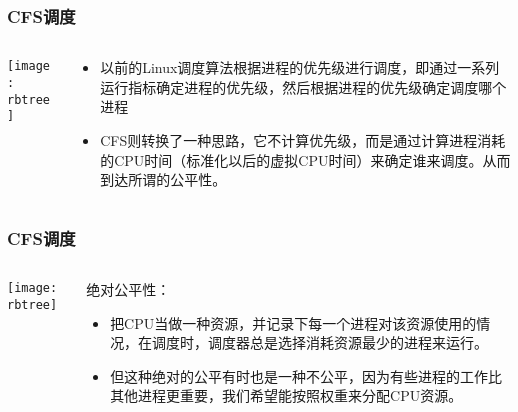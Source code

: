
\begin{frame}
	\frametitle{CFS调度}
	\begin{columns}
	\begin{column}{.4\textwidth}
	\Large \centering
	
    \texttt{[image: rbtree]}
	
	\end{column}
	
	\begin{column}{.6\textwidth}
\begin{itemize}
	\item 以前的Linux调度算法根据进程的优先级进行调度，即通过一系列运行指标确定进程的优先级，然后根据进程的优先级确定调度哪个进程
	\item CFS则转换了一种思路，它不计算优先级，而是通过计算进程消耗的CPU时间（标准化以后的虚拟CPU时间）来确定谁来调度。从而到达所谓的公平性。

	\end{itemize}

	\end{column}
\end{columns}
\end{frame}


\begin{frame}
	\frametitle{CFS调度}
	\begin{columns}
		\begin{column}{.4\textwidth}
			\Large \centering
			
			\texttt{[image: rbtree]}
			
		\end{column}
		
		\begin{column}{.6\textwidth}
			绝对公平性：
			\begin{itemize}
				\item 把CPU当做一种资源，并记录下每一个进程对该资源使用的情况，在调度时，调度器总是选择消耗资源最少的进程来运行。
				\item 但这种绝对的公平有时也是一种不公平，因为有些进程的工作比其他进程更重要，我们希望能按照权重来分配CPU资源。
				
			\end{itemize}
			
		\end{column}
	\end{columns}
\end{frame}


